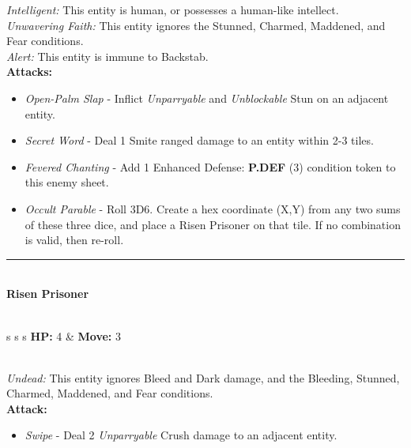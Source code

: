 \emph{Intelligent:} This entity is human, or possesses a human-like intellect.\\

\emph{Unwavering Faith:} This entity ignores the Stunned, Charmed, Maddened, and Fear conditions.\\

\emph{Alert:} This entity is immune to Backstab.\\

\textbf{Attacks:}
\begin{itemize}
\item \emph{Open-Palm Slap} - Inflict \emph{Unparryable} and \emph{Unblockable} Stun on an adjacent entity.
\item \emph{Secret Word} - Deal 1 Smite ranged damage to an entity within 2-3 tiles.
\item \emph{Fevered Chanting} - Add 1 Enhanced Defense: \textbf{P.DEF} (3) condition token to this enemy sheet.
\item \emph{Occult Parable} - Roll 3D6. Create a hex coordinate (X,Y) from any two sums of these three dice, and place a Risen Prisoner on that tile. If no combination is valid, then re-roll.
\end{itemize}
\hrule
\ \\
{\large \textbf{Risen Prisoner}}\\\\
\begin{tabular}{s s s}
\textbf{HP:} 4 & \textbf{Move:} 3\\
\end{tabular}\\

\emph{Undead:} This entity ignores Bleed and Dark damage, and the Bleeding, Stunned, Charmed, Maddened, and Fear conditions.\\

\textbf{Attack:}
\begin{itemize}
\item \emph{Swipe} - Deal 2 \emph{Unparryable} Crush damage to an adjacent entity.
\end{itemize}

\pagebreak

